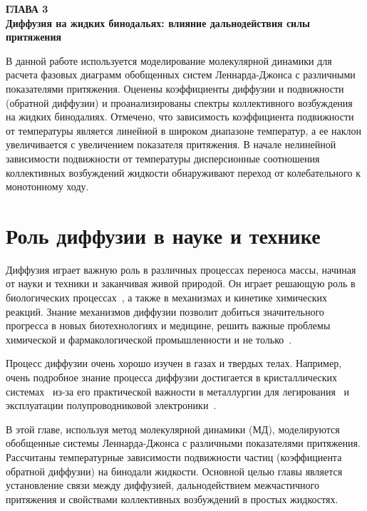 
\newpage
\begin{center}
\textbf{\large ГЛАВА 3 \\ Диффузия на жидких бинодальях: влияние дальнодействия силы притяжения}
\end{center}


В данной работе используется моделирование молекулярной динамики для расчета фазовых диаграмм обобщенных систем Леннарда-Джонса с различными показателями притяжения. Оценены коэффициенты диффузии и подвижности (обратной диффузии) и проанализированы спектры коллективного возбуждения на жидких бинодалиях. Отмечено, что зависимость коэффициента подвижности от температуры является линейной в широком диапазоне температур, а ее наклон увеличивается с увеличением показателя притяжения. В начале нелинейной зависимости подвижности от температуры дисперсионные соотношения коллективных возбуждений жидкости обнаруживают переход от колебательного к монотонному ходу.

\section{Роль диффузии в науке и технике}
\label{MACR-SecIntroduction}

Диффузия играет важную роль в различных процессах переноса массы, начиная от науки и техники и заканчивая живой природой.
Он играет решающую роль в биологических процессах~\cite{10.1016/j.bbagen.2013.09.037, 10.1038/s41598-018-22643-9}, а также в механизмах и кинетике химических реакций. Знание механизмов диффузии позволит добиться значительного прогресса в новых биотехнологиях и медицине, решить важные проблемы химической и фармакологической промышленности и не только~\cite{10.1002/3527602836}.

Процесс диффузии очень хорошо изучен в газах и твердых телах. Например, очень подробное знание процесса диффузии достигается в кристаллических системах~\cite{10.1016/0079-6816(95)00039-2} из-за его практической важности в металлургии для легирования~\cite{10.1016/s0924-0136(96)02826-9, 10.1016/j.actamat.2015.10.010, 10.1134/s1063783411110308} и эксплуатации полупроводниковой электроники~\cite{10.1103/physrevlett.84.4220, 10.1016/j.physrep.2009.10.003}.

В этой главе, используя метод молекулярной динамики (МД), моделируются обобщенные системы Леннарда-Джонса с различными показателями притяжения. Рассчитаны температурные зависимости подвижности частиц (коэффициента обратной диффузии) на бинодали жидкости. Основной целью главы является установление связи между диффузией, дальнодействием межчастичного притяжения и свойствами коллективных возбуждений в простых жидкостях.

